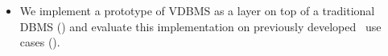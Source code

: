 \begin{itemize}[leftmargin=*]
\item 
We implement a prototype of VDBMS as a layer on top of a traditional DBMS
() and evaluate this implementation on previously
developed~\cite{ALW21vamos} use cases ().
\end{itemize}




